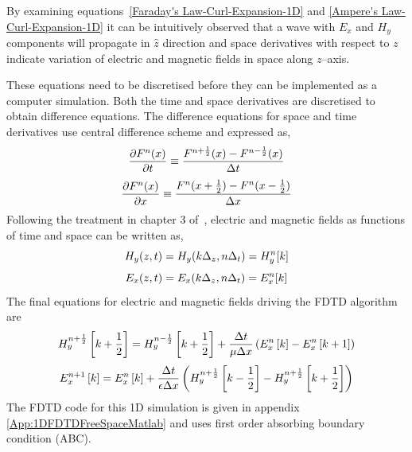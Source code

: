 By examining equations~\ref{Faraday's Law-Curl-Expansion-1D} and \ref{Ampere's Law-Curl-Expansion-1D} it can be intuitively observed that a wave with $E_x$ and $H_y$ components will propagate in $\hat{z}$ direction and space derivatives with respect to $z$ indicate variation of electric and magnetic fields in space along $z$--axis.

These equations need to be discretised before they can be implemented as a computer simulation. Both the time and space derivatives are discretised to obtain difference equations. The difference equations for space and time derivatives use central difference scheme and expressed as,
\begin{equation}
\centering
\dfrac{\partial F^n(x)}{\partial t} \equiv \dfrac{F^{n+\frac{1}{2}}(x)-F^{n-\frac{1}{2}}(x)}{\Delta t}
\label{central-difference-time}
\end{equation}
\begin{equation}
\centering
\dfrac{\partial F^n(x)}{\partial x} \equiv \dfrac{F^n(x+\frac{1}{2})-F^n(x-\frac{1}{2})}{\Delta x}
\label{central-difference-space}
\end{equation}
Following the treatment in chapter 3 of~\cite{JBSchneiderUFDTD}, electric and magnetic fields as functions of time and space can be written as,
\begin{equation}
\centering
H_y (z,t)=H_y (k\Delta _z,n\Delta _t)=H^n_y[k]
\label{Hy-of-z_and_t}
\end{equation}
\begin{equation}
\centering
E_x (z,t)=E_x (k\Delta _z,n\Delta _t)=E^n_x[k]
\label{Ex-of-z_and_t}
\end{equation}
The final equations for electric and magnetic fields driving the FDTD algorithm are
\begin{equation}
\centering
H^{n+\frac{1}{2}}_y \left[k+\frac{1}{2}\right]=H^{n-\frac{1}{2}}_y \left[k+\frac{1}{2}\right] + \dfrac{\Delta t}{\mu \Delta x} \left( E^{n}_x \left[k\right] - E^{n}_x \left[k+1\right] \right)
\label{Hy-1D-Simple-FDTD-Driver}
\end{equation}
\begin{equation}
\centering
E^{n+1}_x \left[k\right]=E^{n}_x \left[k\right] + \dfrac{\Delta t}{\epsilon \Delta x} \left( H^{n+\frac{1}{2}}_y \left[k-\frac{1}{2}\right] - H^{n+\frac{1}{2}}_y \left[k+\frac{1}{2}\right] \right)
\label{Ex-1D-Simple-FDTD-Driver}
\end{equation}
The FDTD code for this 1D simulation is given in appendix \ref{App:1DFDTDFreeSpaceMatlab} and uses first order absorbing boundary condition (ABC).
